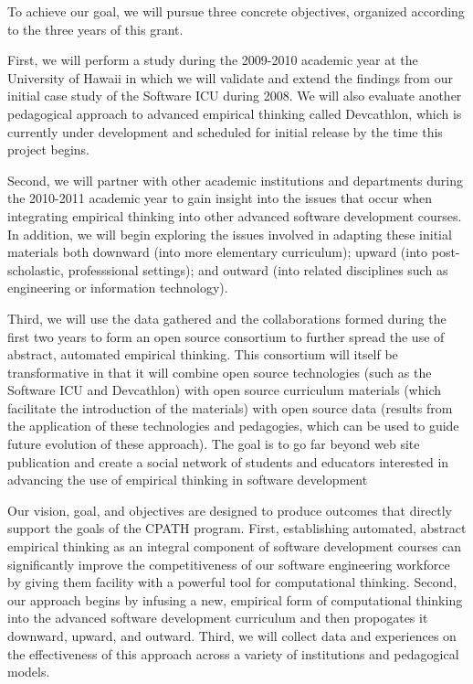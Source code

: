 To achieve our goal, we will pursue three concrete objectives, organized
according to the three years of this grant.  

First, we will perform a study during the 2009-2010 academic year at the
University of Hawaii in which we will validate and extend the findings from
our initial case study of the Software ICU during 2008.  We will also
evaluate another pedagogical approach to advanced empirical thinking called
Devcathlon, which is currently under development and scheduled for initial
release by the time this project begins.

Second, we will partner with other academic institutions and departments
during the 2010-2011 academic year to gain insight into the issues that
occur when integrating empirical thinking into other advanced software
development courses.  In addition, we will begin exploring the issues
involved in adapting these initial materials both downward (into more
elementary curriculum); upward (into post-scholastic, professsional
settings); and outward (into related disciplines such as engineering or
information technology).

Third, we will use the data gathered and the collaborations formed during
the first two years to form an open source consortium to further spread the
use of abstract, automated empirical thinking.  This consortium will itself
be transformative in that it will combine open source technologies (such as
the Software ICU and Devcathlon) with open source curriculum materials
(which facilitate the introduction of the materials) with open source data
(results from the application of these technologies and pedagogies, which
can be used to guide future evolution of these approach).  The goal is to
go far beyond web site publication and create a social network of students
and educators interested in advancing the use of empirical thinking in
software development

Our vision, goal, and objectives are designed to produce outcomes that
directly support the goals of the CPATH program.  First, establishing
automated, abstract empirical thinking as an integral component of software
development courses can significantly improve the competitiveness of our
software engineering workforce by giving them facility with a powerful tool
for computational thinking.  Second, our approach begins by infusing a new,
empirical form of computational thinking into the advanced software
development curriculum and then propogates it downward, upward, and
outward.  Third, we will collect data and experiences on the effectiveness
of this approach across a variety of institutions and pedagogical models.

